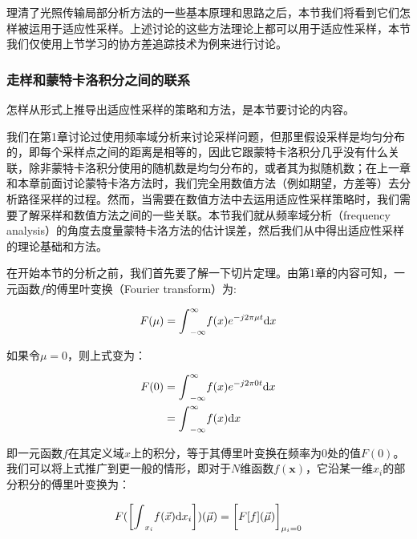 理清了光照传输局部分析方法的一些基本原理和思路之后，本节我们将看到它们怎 样被运用于适应性采样。上述讨论的这些方法理论上都可以用于适应性采样，本节我们仅使用上节学习的协方差追踪技术为例来进行讨论。






\subsubsection{走样和蒙特卡洛积分之间的联系}
怎样从形式上推导出适应性采样的策略和方法，是本节要讨论的内容。

我们在第1章讨论过使用频率域分析来讨论采样问题，但那里假设采样是均匀分布的，即每个采样点之间的距离是相等的，因此它跟蒙特卡洛积分几乎没有什么关联，除非蒙特卡洛积分使用的随机数是均匀分布的，或者其为拟随机数；在上一章和本章前面讨论蒙特卡洛方法时，我们完全用数值方法（例如期望，方差等）去分析路径采样的过程。然而，当需要在数值方法中去运用适应性采样策略时，我们需要了解采样和数值方法之间的一些关联。本节我们就从频率域分析（frequency analysis）的角度去度量蒙特卡洛方法的估计误差，然后我们从中得出适应性采样的理论基础和方法。

在开始本节的分析之前，我们首先要了解一下切片定理。由第1章的内容可知，一元函数$f$的傅里叶变换（Fourier transform）为:

\begin{equation}
	F(\mu)={\rm \int}^{\infty}_{-\infty}f(x)e^{-j2\pi\mu t}{\rm d}x
\end{equation}

\noindent 如果令$\mu=0$，则上式变为：

\begin{equation}
\begin{aligned}
	F(0)&={\rm \int}^{\infty}_{-\infty}f(x)e^{-j2\pi 0 t}{\rm d}x\\
	&={\rm \int}^{\infty}_{-\infty}f(x){\rm d}x
\end{aligned}
\end{equation}

\noindent 即一元函数$f$在其定义域$x$上的积分，等于其傅里叶变换在频率为$0$处的值$F(0)$。我们可以将上式推广到更一般的情形，即对于$N$维函数$f(\mathbf{x})$，它沿某一维$x_i$的部分积分的傅里叶变换为：

\begin{equation}
	F(\bigg[{\rm \int}_{x_i}f(\vec{x}){\rm d}x_i\bigg])(\vec{\mu})=\bigg[F[f](\vec{\mu})\bigg]_{\mu_i=0}
\end{equation}

